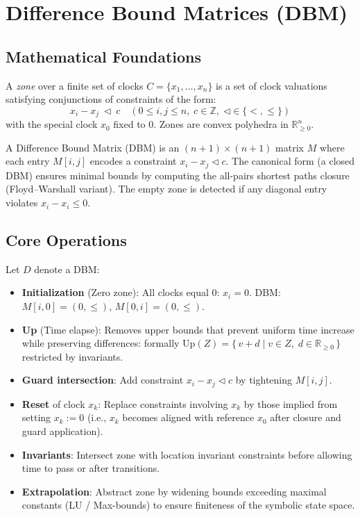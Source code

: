 \section{Difference Bound Matrices (DBM)}
\subsection{Mathematical Foundations}
A \emph{zone} over a finite set of clocks \(C = \{x_1,\dots,x_n\}\) is a set of clock valuations satisfying conjunctions of constraints of the form:
\[ x_i - x_j \ \triangleleft\ c \quad (0 \le i,j \le n,\; c \in \mathbb{Z},\; \triangleleft \in \{<,\le\}) \]
with the special clock \(x_0\) fixed to 0. Zones are convex polyhedra in \(\mathbb{R}_{\ge 0}^n\).

A Difference Bound Matrix (DBM) is an \((n+1)\times(n+1)\) matrix \(M\) where each entry \(M[i,j]\) encodes a constraint \(x_i - x_j \triangleleft c\). The canonical form (a closed DBM) ensures minimal bounds by computing the all-pairs shortest paths closure (Floyd–Warshall variant). The empty zone is detected if any diagonal entry violates \(x_i - x_i \le 0\).

\subsection{Core Operations}
Let \(D\) denote a DBM:
\begin{itemize}
  \item \textbf{Initialization} (Zero zone): All clocks equal 0: \(x_i = 0\). DBM: \(M[i,0] = (0,\le)\), \(M[0,i] = (0,\le)\).
  \item \textbf{Up} (Time elapse): Removes upper bounds that prevent uniform time increase while preserving differences: formally \(\mathrm{Up}(Z) = \{\, v + d \mid v\in Z,\; d\in \mathbb{R}_{\ge 0}\,\}\) restricted by invariants.
  \item \textbf{Guard intersection}: Add constraint \(x_i - x_j \triangleleft c\) by tightening \(M[i,j]\).
  \item \textbf{Reset} of clock \(x_k\): Replace constraints involving \(x_k\) by those implied from setting \(x_k := 0\) (i.e., \(x_k\) becomes aligned with reference \(x_0\) after closure and guard application).
  \item \textbf{Invariants}: Intersect zone with location invariant constraints before allowing time to pass or after transitions.
  \item \textbf{Extrapolation}: Abstract zone by widening bounds exceeding maximal constants (LU / Max-bounds) to ensure finiteness of the symbolic state space.
\end{itemize}

